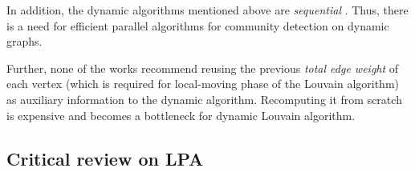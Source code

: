 {In addition, the dynamic algorithms mentioned above are \textit{sequential} \cite{com-aynaud10, com-chong13, com-meng16, com-cordeiro16, com-zarayeneh21}. Thus, there is a need for efficient parallel algorithms for community detection on dynamic graphs. Further, none of the works recommend reusing the previous \textit{total edge weight} of each vertex (which is required for local-moving phase of the Louvain algorithm) as auxiliary information to the dynamic algorithm. Recomputing it from scratch is expensive and becomes a bottleneck for dynamic Louvain algorithm.




\subsection{Critical review on LPA}

}
